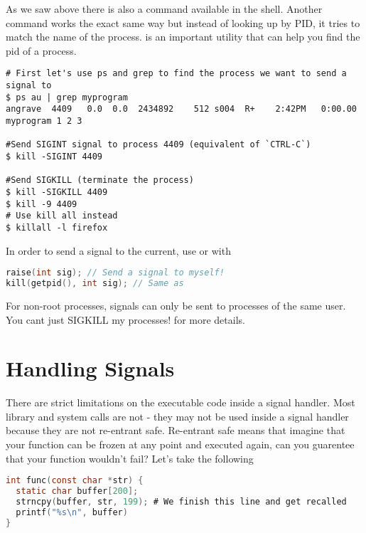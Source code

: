 As we saw above there is also a  command available in the shell. Another command  works the exact same way but instead of looking up by PID, it tries to match the name of the process.  is an important utility that can help you find the pid of a process.

\begin{lstlisting}[language=console]
# First let's use ps and grep to find the process we want to send a signal to
$ ps au | grep myprogram
angrave  4409   0.0  0.0  2434892    512 s004  R+    2:42PM   0:00.00 myprogram 1 2 3

#Send SIGINT signal to process 4409 (equivalent of `CTRL-C`)
$ kill -SIGINT 4409

#Send SIGKILL (terminate the process)
$ kill -SIGKILL 4409
$ kill -9 4409
# Use kill all instead
$ killall -l firefox
\end{lstlisting}

In order to send a signal to the current, use  or  with 

\begin{lstlisting}[language=C]
raise(int sig); // Send a signal to myself!
kill(getpid(), int sig); // Same as
\end{lstlisting}

For non-root processes, signals can only be sent to processes of the same user. You cant just SIGKILL my processes!  for more details.


\section{Handling Signals}

There are strict limitations on the executable code inside a signal handler. Most library and system calls are not  - they may not be used inside a signal handler because they are not re-entrant safe. Re-entrant safe means that imagine that your function can be frozen at any point and executed again, can you guarentee that your function wouldn't fail? Let's take the following

\begin{lstlisting}[language=C]
int func(const char *str) {
  static char buffer[200];
  strncpy(buffer, str, 199); # We finish this line and get recalled
  printf("%s\n", buffer)
}
\end{lstlisting}

